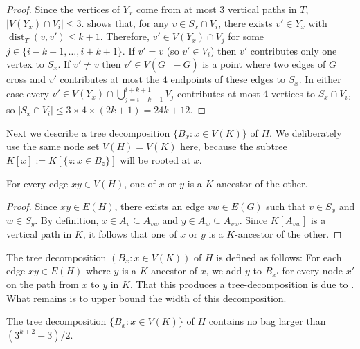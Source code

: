 \documentclass{patmorin}
\DeclareMathOperator{\dist}{dist}
\begin{document}
\begin{proof}
  Since the vertices of $Y_x$ come from at most 3 vertical paths in $T$, $|V(Y_x)\cap V_i|\le 3$.   shows that, for any $v\in S_x\cap V_i$, there exists $v'\in Y_x$ with $\dist_T(v,v')\le k+1$. Therefore, $v'\in V(Y_x)\cap V_{j}$ for some $j\in\{i-k-1,\ldots,i+k+1\}$.  If $v'=v$ (so $v'\in V_i$) then $v'$ contributes only one vertex to $S_x$.  If $v'\neq v$ then $v'\in V(G^+-G)$ is a point where two edges of $G$ cross and $v'$ contributes at most the $4$ endpoints of these edges to $S_x$. In either case every $v'\in V(Y_x)\cap \bigcup_{j=i-k-1}^{i+k+1} V_j$ contributes at most $4$ vertices to $S_x\cap V_i$, so $|S_x\cap V_i|\le 3\times 4\times (2k+1) = 24k+12$.
\end{proof}

Next we describe a tree decomposition $\{B_x:x\in V(K)\}$ of $H$.  We deliberately use the same node set $V(H)=V(K)$ here, because the subtree $K[x]:=K[\{z:x\in B_z\}]$ will be rooted at $x$.  

\begin{clm}
   For every edge $xy\in V(H)$, one of $x$ or $y$ is a $K$-ancestor of the other.
 \end{clm}
 
 \begin{proof}
   Since $xy\in E(H)$, there exists an edge $vw\in E(G)$ such that $v\in S_x$ and $w\in S_y$.  By definition, $x\in A_v\subseteq A_{vw}$ and $y\in A_w\subseteq A_{vw}$.  Since $K[A_{vw}]$ is a vertical path in $K$, it follows that one of $x$ or $y$ is a $K$-ancestor of the other. 
\end{proof}

The tree decomposition $(B_x:x\in V(K))$ of $H$ is defined as follows: For each edge $xy\in E(H)$ where $y$ is a $K$-ancestor of $x$, we add $y$ to $B_{x'}$ for every node $x'$ on the path from $x$ to $y$ in $K$.  That this produces a tree-decomposition is due to .  What remains is to upper bound the width of this decomposition.

\begin{clm}
  The tree decomposition $\{B_x: x\in V(K)\}$ of $H$ contains no bag larger than $(3^{k+2}-3)/2$.
\end{clm}
\end{document}
